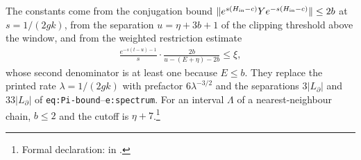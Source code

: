 \documentclass{article}
\begin{document}
The constants come from the conjugation bound
$\lVert e^{s(H_{\rm in}-c)}Ye^{-s(H_{\rm in}-c)}\rVert\le2b$ at
$s=1/(2gk)$, from the separation $u=\eta+3b+1$ of the clipping threshold
above the window, and from the weighted restriction estimate
\begin{align*}
    \frac{e^{-s(t-u)-1}}{s}\cdot\frac{2b}{u-(E+\eta)-2b}\le\xi,
\end{align*}
whose second denominator is at least one because $E\le b$. They replace the
printed rate $\lambda=1/(2gk)$ with prefactor $6\lambda^{-3/2}$ and the
separations $3|L_\partial|$ and $33|L_\partial|$ of
\texttt{eq:Pi-bound}--\texttt{e:spectrum}. For an interval $\Lambda$ of a
nearest-neighbour chain, $b\le2$ and the cutoff is $\eta+7$.\footnote{Formal declaration:
    in .}
\end{document}
